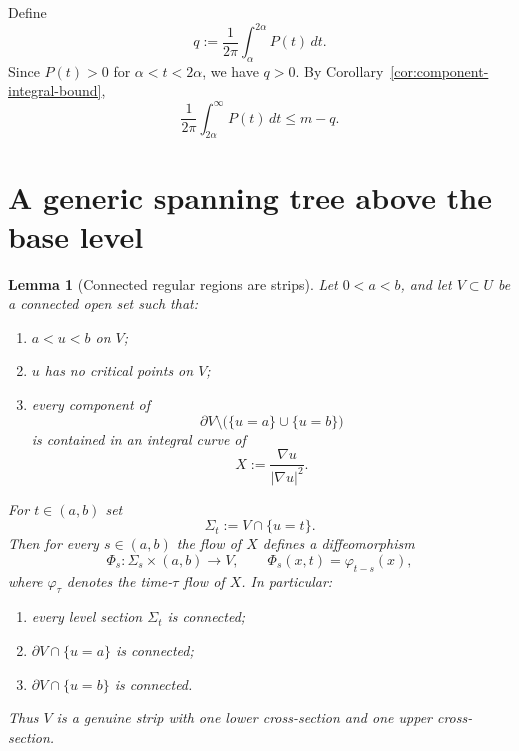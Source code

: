 \documentclass[12pt]{amsart}
\theoremstyle{definition}
\newtheorem{lemma}[theorem]{Lemma}
\theoremstyle{remark}
\begin{document}
\medskip
\noindent Define
\[
 q:=\frac{1}{2\pi}\int_\alpha^{2\alpha} P(t)\,dt.
\]
Since $P(t)>0$ for $\alpha<t<2\alpha$, we have $q>0$. By Corollary~\ref{cor:component-integral-bound},
\begin{equation}
\frac{1}{2\pi}\int_{2\alpha}^{\infty} P(t)\,dt\le m-q.
\tag{9}
\end{equation}

\section{A generic spanning tree above the base level}

\begin{lemma}[Connected regular regions are strips]\label{lem:regular-strip}
\emph{Let $0<a<b$, and let $V\subset U$ be a connected
open set such that:}
\begin{enumerate}
\item[(i)] \emph{$a<u<b$ on $V$;}
\item[(ii)] \emph{$u$ has no critical points on $V$;}
\item[(iii)] \emph{every component of
\[
 \partial V\setminus \bigl(\{u=a\}\cup\{u=b\}\bigr)
\]
is contained in an integral curve of
\[
 X:=\frac{\nabla u}{|\nabla u|^2}.
\]}
\end{enumerate}
\emph{For $t\in(a,b)$ set
\[
 \Sigma_t:=V\cap\{u=t\}.
\]
Then for every $s\in(a,b)$ the flow of $X$ defines a diffeomorphism
\[
 \Phi_s:\Sigma_s\times(a,b)\to V,\qquad \Phi_s(x,t)=\varphi_{t-s}(x),
\]
where $\varphi_\tau$ denotes the time-$\tau$ flow of $X$. In particular:}
\begin{enumerate}
\item[(a)] \emph{every level section $\Sigma_t$ is connected;}
\item[(b)] \emph{$\partial V\cap\{u=a\}$ is connected;}
\item[(c)] \emph{$\partial V\cap\{u=b\}$ is connected.}
\end{enumerate}
\emph{Thus $V$ is a genuine strip with one lower cross-section and one upper cross-section.}
\end{lemma}
\end{document}
